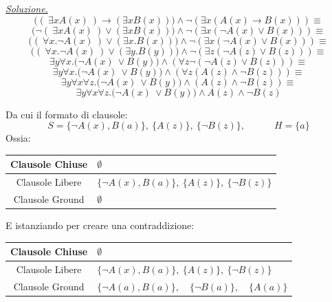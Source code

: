 \documentclass[a4paper,10pt]{article}
\begin{document}
{\begin{itemize}[label=, leftmargin=0pt]
    \begin{osservazioni}
    \underline{\textit{Soluzione.}}\\
    $$\bigg((\ \exists x A(x)\ ) \rightarrow (\exists x B(x)) \bigg) \land \lnot (\exists x (A(x) \rightarrow B(x)))\equiv$$
    $$\bigg(\lnot(\ \exists x A(x)\ ) \lor (\exists x B(x)) \bigg) \land \lnot  (\exists x (\lnot A(x) \lor B(x)))\equiv$$
    $$\bigg((\ \forall x. \lnot A(x)\ ) \lor (\exists x. B(x)) \bigg) \land \lnot  (\exists x (\lnot A(x) \lor B(x)))\equiv$$
    $$\bigg((\ \forall x. \lnot A(x)\ ) \lor (\exists y. B(y)) \bigg) \land \lnot  (\exists z (\lnot A(z) \lor B(z)))\equiv$$
    $$\exists y\forall x.\bigg(\lnot A(x)\ \lor B(y) \bigg) \land  (\forall z \lnot (\lnot A(z) \lor B(z)))\equiv$$
    $$\exists y\forall x.\bigg(\lnot A(x)\ \lor B(y) \bigg) \land  (\forall z ( A(z) \land \lnot B(z)))\equiv$$
    $$\exists y\forall x\forall z.\bigg(\lnot A(x)\ \lor B(y) \bigg) \land  ( A(z) \land \lnot B(z)) \equiv$$
    $$\exists y\forall x\forall z.\bigg(\lnot A(x)\ \lor B(y) \bigg) \land  A(z) \land \lnot B(z)$$
    
    Da cui il formato di clausole:
    $$S=\{\lnot A(x),B(a)\},\ \{A(z)\},\ \{\lnot B(z)\},\quad\quad\quad H=\{a\}$$
    Ossia:
    \begin{table}[H]
    \centering
    \small 
    \renewcommand{\arraystretch}{1.5} 
    
    \begin{tabularx}{\textwidth}{|c|>{\centering\arraybackslash}X|}
        \hline
        Clausole Chiuse & $\emptyset$ \\
        \hline
        Clausole Libere & 
            $\{\lnot A(x),B(a)\},\ \{A(z)\},\ \{\lnot B(z)\}$
            \\
        \hline
        Clausole Ground & $\emptyset$ \\
        \hline
    \end{tabularx}
    \end{table}
    E istanziando per creare una contraddizione:

    \begin{table}[H]
    \centering
    \small 
    \renewcommand{\arraystretch}{1.5} 
    
    \begin{tabularx}{\textwidth}{|c|>{\centering\arraybackslash}X|}
        \hline
        Clausole Chiuse & $\emptyset$ \\
        \hline
        Clausole Libere & 
            $\{\lnot A(x),B(a)\},\ \{A(z)\},\ \{\lnot B(z)\}$
            \\
        \hline
        Clausole Ground & $\{\lnot A(a),B(a)\},\quad \{\lnot B(a)\},\quad \{A(a)\}$\\
        \hline
    \end{tabularx}
    \end{table}


\end{osservazioni}
\end{itemize}}
\end{document}
